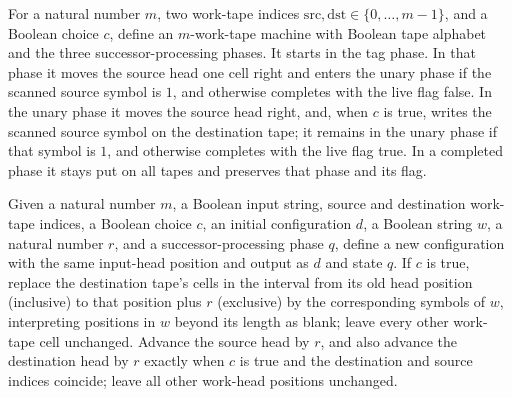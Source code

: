 \begin{definition}
\label{Turing.StepBlock.succFieldTM}
\leanok
{}
For a natural number $m$, two work-tape indices
$\mathrm{src},\mathrm{dst}\in\{0,\ldots,m-1\}$, and a Boolean choice $c$, define an
$m$-work-tape machine with Boolean tape alphabet and the three successor-processing
phases. It starts in the tag phase. In that phase it moves the source head one cell
right and enters the unary phase if the scanned source symbol is $1$, and otherwise
completes with the live flag false. In the unary phase it moves the source head right,
and, when $c$ is true, writes the scanned source symbol on the destination tape; it
remains in the unary phase if that symbol is $1$, and otherwise completes with the live
flag true. In a completed phase it stays put on all tapes and preserves that phase and
its flag.
\end{definition}

\begin{definition}
\label{Turing.StepBlock.succFieldCfg}
\leanok
{}
Given a natural number $m$, a Boolean input string, source and destination work-tape
indices, a Boolean choice $c$, an initial configuration $d$, a Boolean string $w$, a
natural number $r$, and a successor-processing phase $q$, define a new configuration
with the same input-head position and output as $d$ and state $q$. If $c$ is true,
replace the destination tape's cells in the interval from its old head position
(inclusive) to that position plus $r$ (exclusive) by the corresponding symbols of $w$,
interpreting positions in $w$ beyond its length as blank; leave every other work-tape
cell unchanged. Advance the source head by $r$, and also advance the destination head by
$r$ exactly when $c$ is true and the destination and source indices coincide; leave all
other work-head positions unchanged.
\end{definition}


